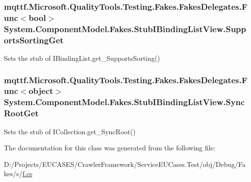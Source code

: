 \hypertarget{class_system_1_1_component_model_1_1_fakes_1_1_stub_i_binding_list_view_a7f4fe5ac639813ff147fb8156b390614}{
\subsubsection[{Supports\-Sorting\-Get}]{\setlength{\rightskip}{0pt plus 5cm}mqttf.\-Microsoft.\-Quality\-Tools.\-Testing.\-Fakes.\-Fakes\-Delegates.\-Func$<$bool$>$ System.\-Component\-Model.\-Fakes.\-Stub\-I\-Binding\-List\-View.\-Supports\-Sorting\-Get}}\label{class_system_1_1_component_model_1_1_fakes_1_1_stub_i_binding_list_view_a7f4fe5ac639813ff147fb8156b390614}


Sets the stub of I\-Binding\-List.\-get\-\_\-\-Supports\-Sorting()

\hypertarget{class_system_1_1_component_model_1_1_fakes_1_1_stub_i_binding_list_view_a5db72a999297317ad493f6d8118cf49a}{
\subsubsection[{Sync\-Root\-Get}]{\setlength{\rightskip}{0pt plus 5cm}mqttf.\-Microsoft.\-Quality\-Tools.\-Testing.\-Fakes.\-Fakes\-Delegates.\-Func$<$object$>$ System.\-Component\-Model.\-Fakes.\-Stub\-I\-Binding\-List\-View.\-Sync\-Root\-Get}}\label{class_system_1_1_component_model_1_1_fakes_1_1_stub_i_binding_list_view_a5db72a999297317ad493f6d8118cf49a}


Sets the stub of I\-Collection.\-get\-\_\-\-Sync\-Root()



The documentation for this class was generated from the following file\-:\begin{DoxyCompactItemize}
\item 
D\-:/\-Projects/\-E\-U\-C\-A\-S\-E\-S/\-Crawler\-Framework/\-Service\-E\-U\-Cases.\-Test/obj/\-Debug/\-Fakes/s/\hyperlink{s_2f_8cs}{f.\-cs}\end{DoxyCompactItemize}
